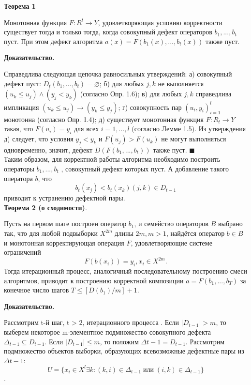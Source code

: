 \textbf{
Теорема 1} 

 Монотонная функция $F : R^t \rightarrow Y $, удовлетворяющая условию корректности существует тогда и только тогда, когда совокупный дефект операторов $b_1, . . . , b_t$ пуст. При этом дефект алгоритма $a(x) = F(b_1(x), . . . , b_t(x)) $ также пуст.


\textbf{Доказательство.}

Справедлива следующая цепочка равносильных утверждений:
а) совокупный дефект пуст: $D_t(b_1, . . . , b_t) = \varnothing$;
б) для любых $j, k$ не выполняется $(u_k \leq u_j ) \wedge (y_j < y_k)$ (согласно Опр. 1.6);
в) для любых $j, k$ справедлива импликация $(u_k \leq u_j ) \rightarrow (y_k \leq y_j )$;
г) совокупность пар $(u_i, y_i)^l_{i=1}$ монотонна (согласно Опр. 1.4);
д) существует монотонная функция $F : R_t \rightarrow Y$ такая, что $F(u_i) = y_i$ для всех
$i = 1, . . . , l$ (согласно Лемме 1.5).
Из утверждения д) следует, что условия $y_j < y_k$ и $F(u_j ) > F(u_k)$ не могут
выполняться одновременно, значит, дефект $D(F(b_1, . . . , b_t))$ также пуст. $\blacksquare$\\


Таким образом, для корректной работы алгоритма необходимо построить операторы $ b_1, . . . , b_t$
, совокупный дефект которых пуст. А добавление такого оператора $b$, что 
\begin{equation}\label{iter}
b_t (x_j) < b_t(x_k) (j, k) \in D_{t-1}
\end{equation}
приводит к устранению дефектной пары.\\

\textbf{Теорема 2 (о сходимости)}. 

Пусть на первом шаге построен оператор $b_1$, и семейство операторов $B$ выбрано так, что для любой подвыборки $X^{2m}$
длины $2m, m > 1$, найдётся оператор $b\in B$ и монотонная корректирующая операция $F$, удовлетворяющие системе ограничений
\[
F(b(x_i)) = y_i
, x_i \in X^{2m}.\]
Тогда итерационный процесс, аналогичный последовательному построению смеси алгоритмов, приводит к построению корректной композиции
$a = F(b_1, . . . , b_T )$ за конечное число шагов $T \leq [D(b_1)/m]+ 1$.


\textbf{Доказательство.}

Рассмотрим t-й шаг, t > 2, итерационного процесса . Если $\vert D_{t-1}\vert > m$,
то выберем некоторое m-элементное подмножество совокупного дефекта $\Delta_{t-1} \subseteq D_{t-1}$.
Если $\vert D_{t-1}\vert \leq m$, то положим $\Delta{t-1} = D_{t-1}$. Рассмотрим подмножество объектов
выборки, образующих всевозможные дефектные пары из $\Delta{t-1}$:
\[ U = \lbrace x_i \in X^l \exists k : (k, i) \in \Delta_{t-1} \; \text{или} \; (i, k) \in \Delta_{t-1} \rbrace\].

